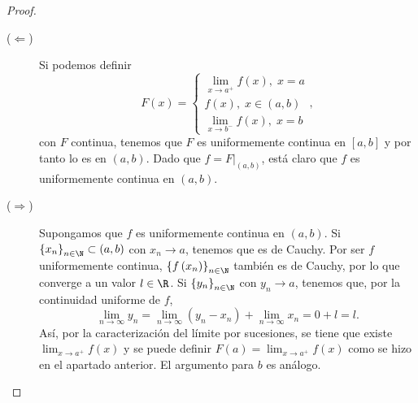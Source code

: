 \begin{proof}
\begin{description}
\item[ ($\Leftarrow $) ] Si podemos definir
	\[ F\left(x\right) = 
	\begin{cases}
	\lim_{x \to a^{+}}f\left(x\right), \; x = a \\
	f\left(x\right), \; x \in \left(a,b\right) \\
	\lim_{x \to b^{-}}f\left(x\right), \; x = b
	\end{cases},\]
	con $\displaystyle F $ continua, tenemos que $\displaystyle F $ es uniformemente continua en $\displaystyle \left[a,b\right]  $ y por tanto lo es en $\displaystyle \left(a,b\right) $. Dado que $\displaystyle f = F|_{\left(a,b\right)} $, está claro que $\displaystyle f $ es uniformemente continua en $\displaystyle \left(a,b\right) $.
\item[ ($\displaystyle \Rightarrow $) ] Supongamos que $\displaystyle f $ es uniformemente continua en $\displaystyle \left(a,b\right) $. Si $\displaystyle \left\{ x_{n}\right\} _{n\in\N} \subset \left(a,b\right) $ con $\displaystyle x_{n} \to a $, tenemos que es de Cauchy. Por ser $\displaystyle f $ uniformemente continua, $\displaystyle \left\{ f\left(x_{n}\right)\right\} _{n\in\N}$ también es de Cauchy, por lo que converge a un valor $\displaystyle l \in \R $. 
	Si $\displaystyle \left\{ y_{n}\right\} _{n\in \N} $ con $\displaystyle y_{n} \to a $, tenemos que, por la continuidad uniforme de $\displaystyle f $,
	\[\lim_{n \to \infty}y_{n} = \lim_{n \to \infty}\left(y_{n}-x_{n}\right)+\lim_{n \to \infty}x_{n} = 0 + l = l .\]
	Así, por la caracterización del límite por sucesiones, se tiene que existe $\displaystyle \lim_{x \to a^{+}}f\left(x\right) $ y se puede definir $\displaystyle F\left(a\right) = \lim_{x \to a^{+}} f\left(x\right)$ como se hizo en el apartado anterior. El argumento para $\displaystyle b $ es análogo.
\end{description}
\end{proof}
